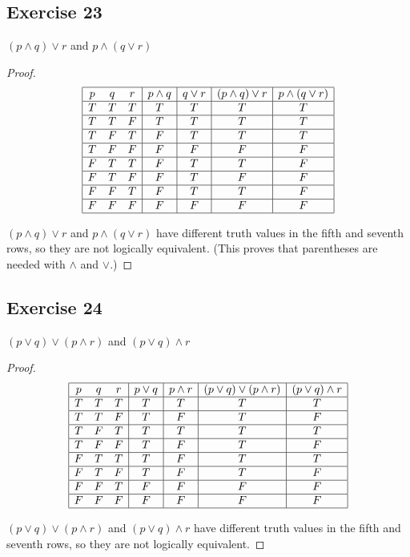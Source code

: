 \documentclass[14pt]{extarticle}
\begin{document}
\subsection{Exercise 23}
$(p \wedge q) \vee r$ and $p \wedge (q \vee r)$

\begin{proof}
$$
\begin{array}{|ccc|c|c|c|c|}
\hline
p & q & r & p \wedge q & q \vee r & (p \wedge q) \vee r & p \wedge (q \vee r) \\
\hline
T & T & T & T & T & T & T \\
\hline
T & T & F & T & T & T & T \\
\hline
T & F & T & F & T & T & T \\
\hline
T & F & F & F & F & F & F \\
\hline
F & T & T & F & T & T & F \\
\hline
F & T & F & F & T & F & F \\
\hline
F & F & T & F & T & T & F \\
\hline
F & F & F & F & F & F & F \\
\hline
\end{array}
$$

$(p \wedge q) \vee r$ and $p \wedge (q \vee r)$ have different truth values in the fifth and seventh rows, so they are not logically equivalent. (This proves that parentheses are needed with $\wedge$ and $\vee$.)
\end{proof}

\subsection{Exercise 24}
$(p \vee q) \vee (p \wedge r)$ and $(p \vee q) \wedge r$

\begin{proof}
$$
\begin{array}{|ccc|c|c|c|c|}
\hline
p & q & r & p \vee q & p \wedge r & (p \vee q) \vee (p \wedge r) & (p \vee q) \wedge r \\
\hline
T & T & T & T & T & T & T \\
\hline
T & T & F & T & F & T & F \\
\hline
T & F & T & T & T & T & T \\
\hline
T & F & F & T & F & T & F \\
\hline
F & T & T & T & F & T & T \\
\hline
F & T & F & T & F & T & F \\
\hline
F & F & T & F & F & F & F \\
\hline
F & F & F & F & F & F & F \\
\hline
\end{array}
$$

$(p \vee q) \vee (p \wedge r)$ and $(p \vee q) \wedge r$ have different truth values in the fifth and seventh rows, so they are not logically equivalent.
\end{proof}
\end{document}
